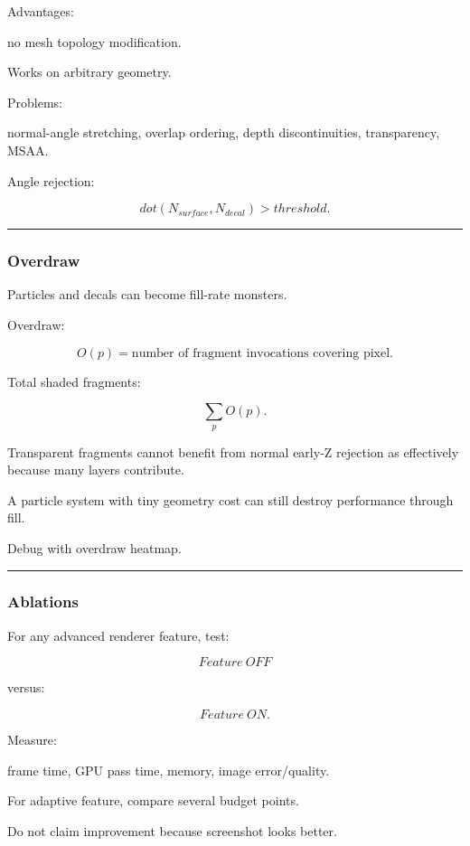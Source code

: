 Advantages:

no mesh topology modification.

Works on arbitrary geometry.

Problems:

normal-angle stretching, overlap ordering, depth discontinuities, transparency, MSAA.

Angle rejection:

\[
dot(N_{surface},N_{decal})
>
threshold.
\]

\begin{center}\rule{0.5\linewidth}{0.5pt}\end{center}

\subsubsection{Overdraw}\label{overdraw}

Particles and decals can become fill-rate monsters.

Overdraw:

\[
O(p)
=
\text{number of fragment invocations covering pixel}.
\]

Total shaded fragments:

\[
\sum_pO(p).
\]

Transparent fragments cannot benefit from normal early-Z rejection as effectively because many layers contribute.

A particle system with tiny geometry cost can still destroy performance through fill.

Debug with overdraw heatmap.

\begin{center}\rule{0.5\linewidth}{0.5pt}\end{center}

\subsubsection{Ablations}\label{ablations}

For any advanced renderer feature, test:

\[
Feature\ OFF
\]

versus:

\[
Feature\ ON.
\]

Measure:

frame time, GPU pass time, memory, image error/quality.

For adaptive feature, compare several budget points.

Do not claim improvement because screenshot looks better.

